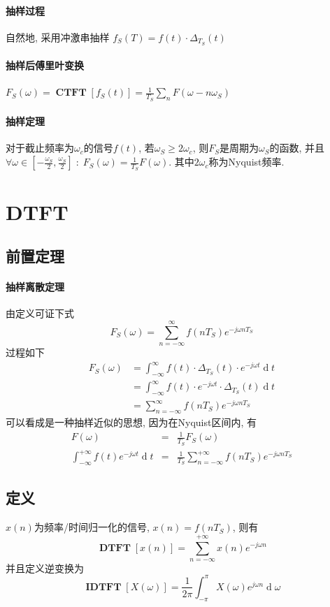 \documentclass{ctexart}
\DeclareMathOperator{\CTFT}{\mathbf{CTFT}}
\DeclareMathOperator{\DTFT}{\mathbf{DTFT}}
\DeclareMathOperator{\IDTFT}{\mathbf{IDTFT}}
\DeclareMathOperator{\ud}{\mathrm{d}}
\begin{document}
\paragraph{抽样过程} 自然地, 采用冲激串抽样 $f_S(T) = f(t)\cdot \Delta_{T_S}(t)$
\paragraph{抽样后傅里叶变换} $\displaystyle F_S(\omega) = \CTFT[ f_S(t) ] = \frac{1}{T_S} \sum_n F(\omega - n \omega_S)$
\paragraph{抽样定理} 对于截止频率为$\omega_c$的信号$f(t)$, 若$\omega_S \ge 2 \omega_c$, 则$F_S$是周期为$\omega_S$的函数,
    并且$\forall \omega \in [-\frac{\omega_S}{2}, \frac{\omega_S}{2}]\;:\;F_S(\omega) = \frac{1}{T_S} F(\omega)$. 其中$2\omega_c$称为Nyquist频率.


\section{DTFT}
\subsection{前置定理}
\paragraph{抽样离散定理} 由定义可证下式
    \[F_S(\omega) = \sum_{n=-\infty}^{\infty} f(nT_S) e^{- j \omega n T_S}\]过程如下
    \begin{align*}
        F_S(\omega) &= \int_{-\infty}^{\infty} f(t) \cdot \Delta_{T_S}(t) \cdot e^{-j \omega t} \ud t\\
            &= \int_{-\infty}^{\infty} f(t) \cdot e^{-j \omega t} \cdot \Delta_{T_S}(t) \ud t\\
            &= \sum_{n=-\infty}^{\infty} f(nT_S) e^{-j \omega nT_S}
    \end{align*}
    可以看成是一种抽样近似的思想, 因为在Nyquist区间内, 有\begin{eqnarray*}
        F(\omega) &=& \frac{1}{T_S} F_S(\omega)\\
        \int_{-\infty}^{+\infty} f(t) e^{-j \omega t} \ud t &=& \frac{1}{T_S} \sum_{n = -\infty}^{+\infty} f(nT_S) e^{-j \omega nT_S}
    \end{eqnarray*}

\subsection{定义} $x(n)$为频率/时间归一化的信号, $x(n) = f(nT_S)$, 则有\[
    \DTFT[x(n)] = \sum_{n = -\infty}^{+\infty} x(n) e^{-j \omega n} \]
    并且定义逆变换为 \[
    \IDTFT[X(\omega)] = \frac{1}{2\pi} \int_{-\pi}^{\pi} X(\omega) e^{j \omega n} \ud \omega\]
\end{document}
